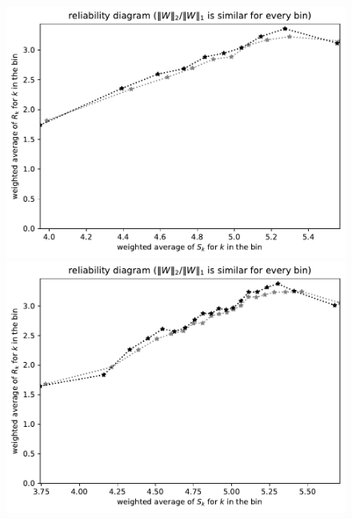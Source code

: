 \documentclass{article}
\begin{document}
\begin{figure}
\begin{centering}
\parbox{\imsize}{\includegraphics[width=\imsize]
{./codes/weighted/County_of_Los_Angeles-NP/equierrs10}}
\quad\quad
\parbox{\imsize}{\includegraphics[width=\imsize]
{./codes/weighted/County_of_Los_Angeles-NP/equierrs20}}

\vspace{\vertsep}


\end{centering}
\end{figure}
\end{document}
